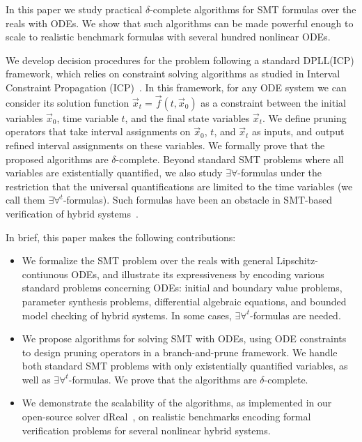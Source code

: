 \documentclass[12pt]{article}
\begin{document}
In this paper we study practical $\delta$-complete algorithms for SMT formulas over the reals with ODEs. We show that such algorithms can be made powerful enough to scale to realistic benchmark formulas with several hundred nonlinear ODEs.

We develop decision procedures for the problem following a standard DPLL(ICP) framework, which relies on constraint solving algorithms as studied in Interval Constraint Propagation (ICP)~\cite{handbookICP}. In this framework, for any ODE system we can consider its solution function $\vec x_t = \vec f(t, \vec x_0)$ as a constraint between the initial variables $\vec x_0$, time variable $t$, and the final state variables $\vec x_t$. We define pruning operators that take interval assignments on $\vec x_0$, $t$, and $\vec x_t$ as inputs, and output refined interval assignments on these variables. We formally prove that the proposed algorithms are $\delta$-complete. Beyond standard SMT problems where all variables are existentially quantified, we also study $\exists\forall$-formulas under the restriction that the universal quantifications are limited to the time variables (we call them $\exists\forall^t$-formulas). Such formulas have been an obstacle in SMT-based verification of hybrid systems~\cite{DBLP:conf/fmcad/CimattiMT12,DBLP:conf/aaai/CimattiMT12}. 

In brief, this paper makes the following contributions:

\begin{itemize}
\item We formalize the SMT problem over the reals with general Lipschitz-contiunous ODEs, and illustrate its expressiveness by encoding various standard problems concerning ODEs: initial and boundary value problems, parameter synthesis problems, differential algebraic equations, and bounded model checking of hybrid systems. In some cases, $\exists\forall^t$-formulas are needed.
\item We propose algorithms for solving SMT with ODEs, using ODE constraints to design pruning operators in a branch-and-prune framework. We handle both standard SMT problems with only existentially quantified variables, as well as $\exists\forall^t$-formulas. We prove that the algorithms are $\delta$-complete.
\item We demonstrate the scalability of the algorithms, as implemented in our open-source solver {\sf dReal}~\cite{DBLP:conf/cade/GaoKC13}, on realistic benchmarks encoding formal verification problems for several nonlinear hybrid systems.
\end{itemize}
\end{document}
